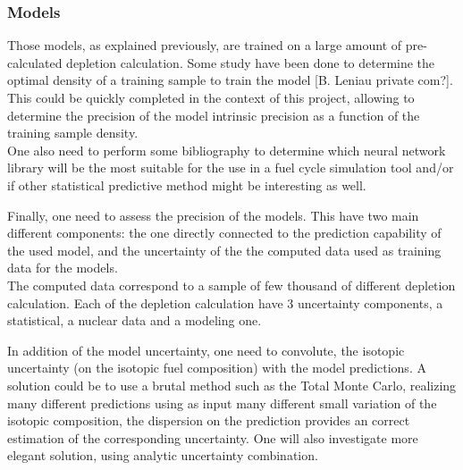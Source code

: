 \documentclass[dvips,12pt]{article}
\begin{document}
\subsubsection{Models}
Those models, as explained previously, are trained on a large amount of pre-calculated depletion calculation. Some study have been done to determine the optimal density of a training sample to train the model [B. Leniau private com?]. This could be quickly completed in the context of this project, allowing to determine the precision of the model intrinsic precision as a function of the training sample density.\\

One also need to perform some bibliography to determine which neural network library will be the most suitable for the use in a fuel cycle simulation tool and/or if other statistical predictive method might be interesting as well.

Finally, one need to assess the precision of the models. This have two main different components: the one directly connected to the prediction capability of the used model, and the uncertainty of the the computed data used as training data for the models.\\
The computed data correspond to a sample of few thousand of different depletion calculation. Each of the depletion calculation have 3 uncertainty components, a statistical, a nuclear data and a modeling one. 

In addition of the model uncertainty, one need to convolute, the isotopic uncertainty (on the isotopic fuel composition) with the model predictions. 
A solution could be to use a brutal method such as the Total Monte Carlo, realizing many different predictions using as input many different  small variation of the isotopic composition, the dispersion on the prediction provides an correct estimation of the corresponding uncertainty. One will also investigate more elegant solution, using analytic uncertainty combination.



\end{document}
